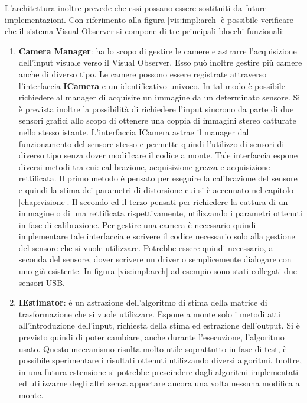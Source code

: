 L'architettura inoltre prevede che essi possano essere sostituiti da future implementazioni. Con riferimento alla figura \ref{vis:impl:arch} è possibile verificare che il sistema Visual Observer si compone di tre principali blocchi funzionali: 
\begin{enumerate}
	\item \textbf{Camera Manager}: ha lo scopo di gestire le camere e astrarre l'acquisizione dell'input visuale verso il Visual Observer. Esso può inoltre gestire più camere anche di diverso tipo. Le camere possono essere registrate attraverso l'interfaccia \textbf{ICamera} e un identificativo univoco. In tal modo è possibile richiedere al manager di acquisire un immagine da un determinato sensore. Si è prevista inoltre la possibilità di richiedere l'input sincrono da parte di due sensori grafici allo scopo di ottenere una coppia di immagini stereo catturate nello stesso istante.
	L'interfaccia ICamera astrae il manager dal funzionamento del sensore stesso e permette quindi l'utilizzo di sensori di diverso tipo senza dover modificare il codice a monte. Tale interfaccia espone diversi metodi tra cui: calibrazione, acquisizione grezza e acquisizione rettificata. Il primo metodo è pensato per eseguire la calibrazione del sensore e quindi la stima dei parametri di distorsione cui si è accennato nel capitolo \ref{chap:visione}. Il secondo ed il terzo pensati per richiedere la cattura di un immagine o di una rettificata rispettivamente, utilizzando i parametri ottenuti in fase di calibrazione. Per gestire una camera è necessario quindi implementare tale interfaccia e scrivere il codice necessario solo alla gestione del sensore che si vuole utilizzare. Potrebbe essere quindi necessario, a seconda del sensore, dover scrivere un driver o semplicemente dialogare con uno già esistente. In figura \ref{vis:impl:arch} ad esempio sono stati collegati due sensori USB.
	
	\item \textbf{IEstimator}: è un astrazione dell'algoritmo di stima della matrice di trasformazione che si vuole utilizzare. Espone a monte solo i metodi atti all'introduzione dell'input, richiesta della stima ed estrazione dell'output. Si è previsto quindi di poter cambiare, anche durante l'esecuzione, l'algoritmo usato. Questo meccanismo risulta molto utile soprattutto in fase di test, è possibile sperimentare i risultati ottenuti utilizzando diversi algoritmi. Inoltre, in una futura estensione si potrebbe prescindere dagli algoritmi implementati ed utilizzarne degli altri senza apportare ancora una volta nessuna modifica a monte.
	

\end{enumerate}
